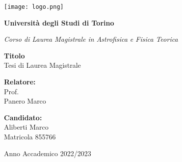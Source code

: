 \thispagestyle{empty}
\begin{center}
    \texttt{[image: logo.png]}
    \vspace{0.5cm}\\
    {\LARGE\bfseries Università degli Studi di Torino \par}
	\vspace{0,3cm}
	{\Large\it Corso di Laurea Magistrale in Astrofisica e Fisica Teorica\par}
    \vspace{2cm}
	{\LARGE\bfseries Titolo}
	\vspace{0.3cm}\\
    {\Large Tesi di Laurea Magistrale}
	\vspace{0,5cm}
\end{center}
\vspace{2cm}
\begin{minipage}[t]{0.4\textwidth} %
    {\large{{\bf Relatore:}\\
        Prof.\\
        Panero Marco}}
\end{minipage}
\hfill
\begin{minipage}[t]{0.47\textwidth}\raggedleft %
    {\large{{\bf Candidato:}\\
        Aliberti Marco\\
        Matricola 855766}}
    \vspace{12mm}
\end{minipage}
\hfill
\vspace{18mm}
\begin{center} %
    \large{Anno Accademico 2022/2023}
\end{center} 

